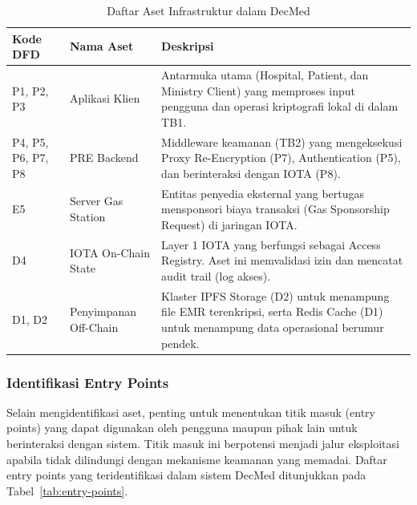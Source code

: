 \begin{table}[htbp]
    \centering
    \caption{Daftar Aset Infrastruktur dalam DecMed}
    \vspace{0.25cm}
    \label{tab:aset-infrastruktur}
    \begin{tabular}{|p{2.5cm}|p{3.5cm}|p{8cm}|}
        \hline
        \textbf{Kode DFD} & \textbf{Nama Aset} & \textbf{Deskripsi} \\
        \hline
        P1, P2, P3 & Aplikasi Klien & Antarmuka utama (Hospital, Patient, dan Ministry Client) yang memproses input pengguna dan operasi kriptografi lokal di dalam TB1. \\
        \hline
        P4, P5, P6, P7, P8 & PRE Backend & Middleware keamanan (TB2) yang mengeksekusi Proxy Re-Encryption (P7), Authentication (P5), dan berinteraksi dengan IOTA (P8). \\
        \hline
        E5 & Server Gas Station & Entitas penyedia eksternal yang bertugas mensponsori biaya transaksi (Gas Sponsorship Request) di jaringan IOTA. \\
        \hline
        D4 & IOTA On-Chain State & Layer 1 IOTA yang berfungsi sebagai Access Registry. Aset ini memvalidasi izin dan mencatat audit trail (log akses). \\
        \hline
        D1, D2 & Penyimpanan Off-Chain & Klaster IPFS Storage (D2) untuk menampung file EMR terenkripsi, serta Redis Cache (D1) untuk menampung data operasional berumur pendek. \\
        \hline
    \end{tabular}
\end{table}


\subsubsection{Identifikasi Entry Points}
Selain mengidentifikasi aset, penting untuk menentukan titik masuk (entry points) yang dapat digunakan oleh pengguna maupun pihak lain untuk berinteraksi dengan sistem. Titik masuk ini berpotensi menjadi jalur eksploitasi apabila tidak dilindungi dengan mekanisme keamanan yang memadai. Daftar entry points yang teridentifikasi dalam sistem DecMed ditunjukkan pada Tabel~\ref{tab:entry-points}.

